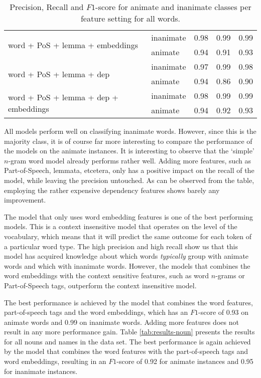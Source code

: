 \documentclass[a4paper,UKenglish]{oasics}
\begin{document}
\begin{table}
\begin{tabular}{llrrr}
\multirow{2}{*}{word + PoS + lemma + embeddings}       & inanimate     &       0.98 &    0.99 &    0.99 \\
                                                       & animate     &       0.94 &    0.91 &    0.93   \\
\multirow{2}{*}{word + PoS + lemma + dep}              & inanimate     &       0.97 &    0.99 &    0.98 \\
                                                       & animate     &       0.94 &    0.86 &    0.90   \\
\multirow{2}{*}{word + PoS + lemma + dep + embeddings} & inanimate     &       0.98 &    0.99 &    0.99 \\
                                                       & animate     &       0.94 &    0.92 &    0.93   \\
\bottomrule
\end{tabular}
\caption{Precision, Recall and $F1$-score for animate and inanimate classes per feature setting for all words.}
\label{tab:results-all}
\end{table}


All models perform well on classifying inanimate words. However, since
this is the majority class, it is of course far more interesting to
compare the performance of the models on the animate instances. It is
interesting to observe that the `simple' $n$-gram word model already
performs rather well. Adding more features, such as Part-of-Speech,
lemmata, etcetera, only has a positive impact on the recall of the
model, while leaving the precision untouched. As can be observed from
the table, employing the rather expensive dependency features shows
barely any improvement.

The model that only uses word embedding features is one of the best
performing models. This is a context insensitive model that operates
on the level of the vocabulary, which means that it will predict the
same outcome for each token of a particular word type. The high
precision and high recall show us that this model has acquired
knowledge about which words \emph{typically} group with animate
words and which with inanimate words. However, the models that combines
the word embeddings with the context sensitive features, such as word
$n$-grams or Part-of-Speech tags, outperform the context insensitive
model.

The best performance is achieved by the model that combines the word
features, part-of-speech tags and the word embeddings, which has an
$F1$-score of 0.93 on animate words and 0.99 on inanimate
words. Adding more features does not result in any more performance
gain.
Table \ref{tab:results-noun} presents the results for all nouns and
names in the data set. The best performance is again achieved by the
model that combines the word features with the part-of-speech tags and
word embeddings, resulting in an $F1$-score of 0.92 for animate
instances and 0.95 for inanimate instances.
\end{document}
